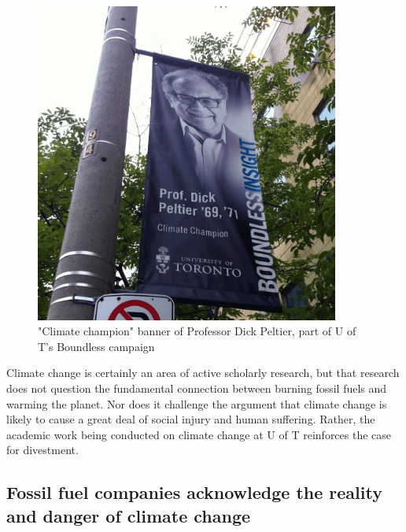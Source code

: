 \begin{figure}[h]
\includegraphics[width=100mm]{s2-peltier.png}
\centering
\caption{"Climate champion" banner of Professor Dick Peltier, part of U of T's Boundless campaign}
\label{fig:s2-peltier}
\end{figure}



Climate change is certainly an area of active scholarly research, but that research does not question the fundamental connection between burning fossil fuels and warming the planet. 
Nor does it challenge the argument that climate change is likely to cause a great deal of social injury and human suffering.
Rather, the academic work being conducted on climate change at U of T reinforces the case for divestment.



	\subsection{Fossil fuel companies acknowledge the reality and danger of climate change}




	

